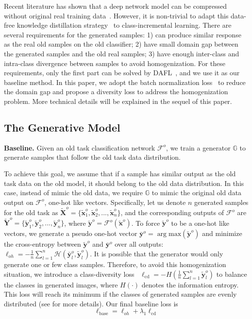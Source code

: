 \documentclass[10pt,twocolumn,letterpaper]{article}
\begin{document}
Recent literature has shown that a deep network model can be compressed without original real training data~\cite{chen2019data,yin2020dreaming}. However, it is non-trivial to adapt this data-free knowledge distillation strategy~\cite{chen2019data} to class-incremental learning. There are several requirements for the generated samples: 
1) can produce similar response as the real old samples on the old classifier; 
2) have small domain gap between the generated samples and the old real samples; 
3) have enough inter-class and intra-class divergence between samples to avoid homogenization. For these requirements, only the first part can be solved by DAFL~\cite{chen2019data}, and we use it as our baseline method. In this paper, we adopt the batch normalization loss~\cite{cai2020zeroq} to reduce the domain gap and propose a diversity loss to address the homogenization problem. More technical details will be explained in the sequel of this paper.


\subsection{The Generative Model}

\textbf{Baseline.}
Given an old task classification network $\mathcal{F}^o$, we train a generator $\mathbb{G}$ to generate samples that follow the old task data distribution.

To achieve this goal, we assume that if a sample has similar output as the old task data on the old model, it should belong to the old data distribution. In this case, instead of mimic the old data, we require $\mathbb{G}$ to mimic the original old data output on $\mathcal{F}^o$, \ie one-hot like vectors. 
Specifically, let us denote $n$ generated samples for the old task as $\widetilde{\mathbf{X}}^o=\{\tilde{\mathbf{x}}_1^o,\tilde{\mathbf{x}}_2^o,...,\tilde{\mathbf{x}}_n^o\}$, and the corresponding outputs of $\mathcal{F}^o$ are $\widetilde{\mathbf{Y}}^o=\{\tilde{\mathbf{y}}_1^o,\tilde{\mathbf{y}}_2^o,...,\tilde{\mathbf{y}}_n^o\}$, where $\tilde{\mathbf{y}}^o = \mathcal{F}^o(\tilde{\mathbf{x}}^o)$. To force $\tilde{\mathbf{y}}^o$ to be a one-hot like vectors, we generate a pseudo one-hot vector $\bar{\mathbf{y}}^o = \arg \text{max}(\tilde{\mathbf{y}}^o)$ and minimize the cross-entropy between $\tilde{\mathbf{y}}^o$ and $\bar{\mathbf{y}}^o$ over all outputs: $\ell_{oh}= -\frac{1}{n}\sum_{l=1}^n\mathcal{H}(\bar{\mathbf{y}}_l^o,\tilde{\mathbf{y}}_l^o).$
It is possible that the generator would only generate one or few class samples. Therefore, to avoid this homogenization situation, we introduce a class-diversity loss~\cite{chen2019data} $\ell_\text{cd} = -H(\frac{1}{n}\sum_{l=1}^n\widetilde{\mathbf{y}}_l^o)$ to balance the classes in generated images, where $H(\cdot)$ denotes the information entropy.
This loss will reach its minimum if the classes of generated samples are evenly distributed (see \cite{chen2019data} for more details).
Our final baseline loss is 
\begin{equation}
    \ell_{\text{base}} = \ell_{oh} +\lambda_1\ell_{\text{cd}}
\end{equation}
\end{document}

